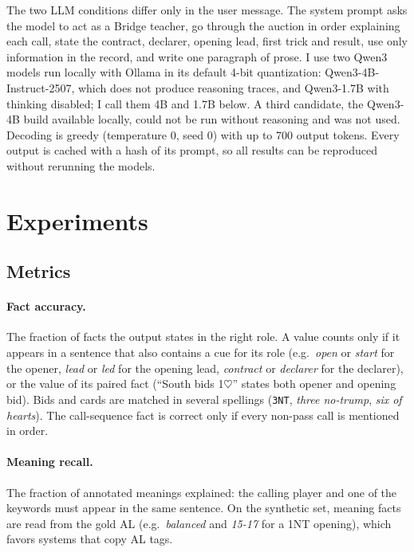 \documentclass[11pt]{article}
\newcommand{\suitH}{$\heartsuit$}
\begin{document}
The two LLM conditions differ only in the user message. The system prompt asks the model to act as a Bridge teacher, go through the auction in order explaining each call, state the contract, declarer, opening lead, first trick and result, use only information in the record, and write one paragraph of prose. I use two Qwen3 models \citep{yang2025qwen3} run locally with Ollama in its default 4-bit quantization: Qwen3-4B-Instruct-2507, which does not produce reasoning traces, and Qwen3-1.7B with thinking disabled; I call them 4B and 1.7B below. A third candidate, the Qwen3-4B build available locally, could not be run without reasoning and was not used. Decoding is greedy (temperature 0, seed 0) with up to 700 output tokens. Every output is cached with a hash of its prompt, so all results can be reproduced without rerunning the models.

\section{Experiments}

\subsection{Metrics}

\paragraph{Fact accuracy.} The fraction of facts the output states in the right role. A value counts only if it appears in a sentence that also contains a cue for its role (e.g.\ \emph{open} or \emph{start} for the opener, \emph{lead} or \emph{led} for the opening lead, \emph{contract} or \emph{declarer} for the declarer), or the value of its paired fact (``South bids 1\suitH{}'' states both opener and opening bid). Bids and cards are matched in several spellings (\texttt{3NT}, \emph{three no-trump}, \emph{six of hearts}). The call-sequence fact is correct only if every non-pass call is mentioned in order.

\paragraph{Meaning recall.} The fraction of annotated meanings explained: the calling player and one of the keywords must appear in the same sentence. On the synthetic set, meaning facts are read from the gold AL (e.g.\ \emph{balanced} and \emph{15-17} for a 1NT opening), which favors systems that copy AL tags.
\end{document}
